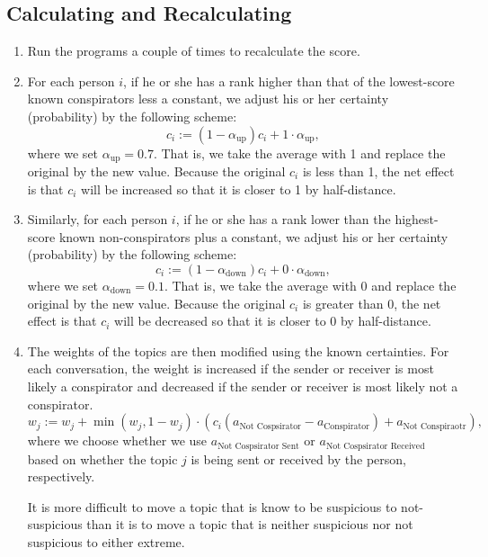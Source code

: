 \documentclass{icmmcm}
\begin{document}
\subsection{Calculating and Recalculating}
\begin{enumerate}

\item Run the programs a couple of times to recalculate
the score.

\item For each person $i$,
if he or she has a 
rank higher than that of the lowest-score known conspirators less a constant,
we adjust his or her certainty (probability) by the following scheme:
\begin{equation}
c_i := (1-\alpha_{\text{up}})c_i + 1\cdot \alpha_{\text{up}},
\label{push_up}
\end{equation}
where we set $\alpha_{\text{up}} = 0.7.$
That is, we take the average with 1 and replace the original by the new value. 
Because the original $c_i$ is less than 1, the net effect is that
$c_i$ will be increased so that it is closer to 1 by half-distance.

\item Similarly,
for each person $i$,
if he or she has a 
rank lower than the highest-score known non-conspirators plus a constant,
we adjust his or her certainty (probability) by the following scheme:
\begin{equation}
c_i := (1 - \alpha_{\text{down}})c_i + 0\cdot \alpha_{\text{down}},
\label{push_down}
\end{equation}
where we set $\alpha_{\text{down}} = 0.1.$
That is, we take the average with 0 and replace the original by the new value. 
Because the original $c_i$ is greater than 0, the net effect is that
$c_i$ will be decreased so that it is closer to 0 by half-distance.

\item The weights of the topics are then modified using the known certainties.  For each conversation, the weight is increased if the sender or receiver is most likely a conspirator and decreased if the sender or receiver is most likely not a conspirator. \[w_j := w_j + \min(w_j,1-w_j) \cdot (c_i(a_{\text{Not Cospsirator}}-a_{\text{Conspirator}})+a_{\text{Not Conspiraotr}}),\] 
where we choose whether we use $a_{\text{Not Cospsirator Sent}}$
or $a_{\text{Not Cospsirator Received}}$ based on whether
the topic $j$ is being sent or received by the person,
respectively.

It is more difficult to move a topic that is know to be suspicious to not-suspicious than it is to move a topic that is neither suspicious nor not suspicious  to either extreme.  
\end{enumerate}
\end{document}
